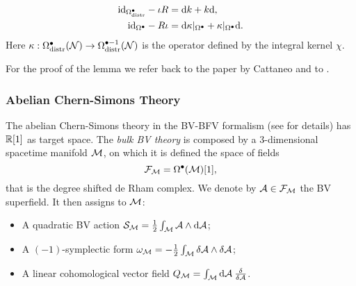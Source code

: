 \begin{lemma}
\begin{enumerate}[label={\normalfont \alph*)}]
\begin{itemize}[label= $\diamond$]
\begin{equation}
\begin{aligned}
                    {\normalfont \text{id}}_{\Omega^\bullet_{\text{\normalfont distr}}} - \iota R =& \; \dd k + k \dd , \\
                    {\normalfont \text{id}}_{\Omega^\bullet} - R \iota =& \; \dd \kappa|_{\Omega^\bullet} + \kappa|_{\Omega^\bullet} \dd .
                \end{aligned}
            \end{equation}
            Here $\kappa: \Omega_{\text{\normalfont distr}}^{\bullet} (\mathcal{N}) \rightarrow \Omega_{\text{\normalfont distr}}^{\bullet - 1} (\mathcal{N})$ is the operator defined by the integral kernel $\chi$.
        \end{itemize}
    \end{enumerate}
\end{lemma}

For the proof of the lemma we refer back to the paper by Cattaneo \etal and to \cite{Proof_second_lemma}.

\subsubsection{Abelian Chern-Simons Theory}
\label{subsubsec:abelian_chern_simons_theory}

The abelian Chern-Simons theory in the BV-BFV formalism (see \cite{Mnfd_boundaries} for details) has $\mathbb{R}[1]$ as target space.
The \emph{bulk BV theory} is composed by a 3-dimensional spacetime manifold $\mathcal{M}$, on which it is defined the space of fields
\begin{equation*}
    \mathcal{F}_{\mathcal{M}} = \Omega^\bullet (\mathcal{M})[1],
\end{equation*}
that is the degree shifted de Rham complex.
We denote by $\mathcal{A} \in \mathcal{F}_{\mathcal{M}}$ the BV superfield.
It then assigns to $\mathcal{M}$:
\begin{itemize}
    \item A quadratic BV action $\mathcal{S}_{\mathcal{M}} = \frac{1}{2}\int_{\mathcal{M}} \mathcal{A} \wedge \dd \mathcal{A}$;
    \item A $(-1)$-symplectic form $\omega_{\mathcal{M}} = - \frac{1}{2} \int_{\mathcal{M}} \delta \mathcal{A} \wedge \delta \mathcal{A}$;
    \item A linear cohomological vector field $Q_{\mathcal{M}} = \int_{\mathcal{M}} \dd \mathcal{A} \: \frac{\delta}{\delta \mathcal{A}}$.
\end{itemize}

